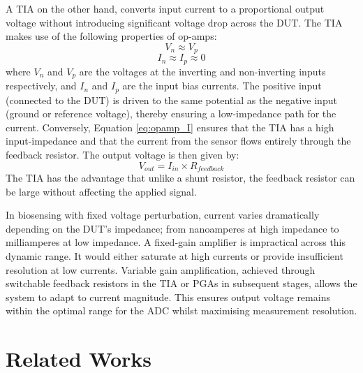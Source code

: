 A \ac{TIA} on the other hand, converts input current to a proportional output voltage without introducing significant voltage drop across the \ac{DUT}. The \ac{TIA} makes use of the following properties of op-amps:
\begin{equation}
    V_n \approx V_p
    \label{eq:opamp_V}
\end{equation}
\begin{equation}
    I_n \approx I_p \approx 0
    \label{eq:opamp_I}
\end{equation}
where $V_n$ and $V_p$ are the voltages at the inverting and non-inverting inputs respectively, and $I_n$ and $I_p$ are the input bias currents. The positive input (connected to the \ac{DUT}) is driven to the same potential as the negative input (ground or reference voltage), thereby ensuring a low-impedance path for the current. Conversely, Equation \ref{eq:opamp_I} ensures that the TIA has a high input-impedance and that the current from the sensor flows entirely through the feedback resistor. The output voltage is then given by:
\begin{equation}
    V_{out}=I_{in} \times R_{feedback}
    \label{eq:tia_gain}
\end{equation}
The \ac{TIA} has the advantage that unlike a shunt resistor, the feedback resistor can be large without affecting the applied signal.

In biosensing with fixed voltage perturbation, current varies dramatically depending on the \ac{DUT}'s impedance; from nanoamperes at high impedance to milliamperes at low impedance. A fixed-gain amplifier is impractical across this dynamic range. It would either saturate at high currents or provide insufficient resolution at low currents. Variable gain amplification, achieved through switchable feedback resistors in the \ac{TIA} or \acp{PGA} in subsequent stages, allows the system to adapt to current magnitude. This ensures output voltage remains within the optimal range for the \ac{ADC} whilst maximising measurement resolution.


\section{Related Works}

\label{chap:literature_review}
